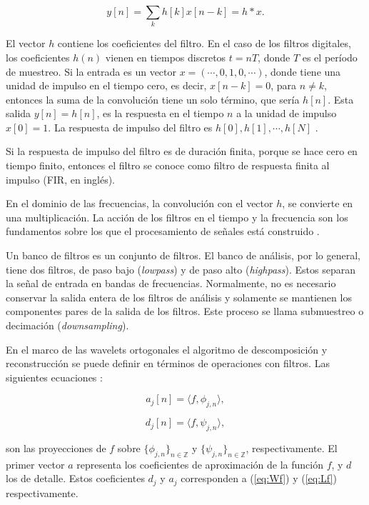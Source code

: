 \begin{equation}
	y[n] = \sum_{k} h[k]x[n-k] = h * x.
\end{equation}

El vector $h$ contiene los coeficientes del filtro. En el caso de los filtros digitales, los 
coeficientes $h(n)$ vienen en tiempos discretos $t=nT$, donde $T$ es el período de muestreo. 
Si la entrada es un vector $x=(\cdots,0,1,0,\cdots)$, donde tiene una unidad de impulso en el tiempo cero,
es decir, $x[n-k]=0$, para $n \neq k$, entonces la suma de la convolución tiene un solo término, que sería
$h[n]$. Esta salida $y[n]=h[n]$, es la respuesta en el tiempo $n$ a la unidad de impulso
$x[0]=1$. La respuesta de impulso del filtro es $h[0],h[1],\cdots,h[N]$ \cite{Gilbert95}.

Si la respuesta de impulso del filtro es de duración finita, porque se hace cero en tiempo finito, entonces
el filtro se conoce como filtro de respuesta finita al impulso (FIR, en inglés).

En el dominio de las frecuencias, la convolución con el vector $h$, se convierte en una multiplicación. La 
acción de los filtros en el tiempo y la frecuencia son los fundamentos sobre los que el procesamiento de señales
está construido \cite{Gilbert95}.

Un banco de filtros es un conjunto de filtros. El banco de análisis, por lo general, tiene dos filtros, 
de paso bajo (\textit{lowpass}) y de paso alto (\textit{highpass}). Estos separan la señal 
de entrada en bandas de frecuencias. Normalmente, no es necesario
conservar la salida entera de los filtros de análisis y solamente se mantienen los componentes pares de la salida
de los filtros. Este proceso se llama submuestreo o decimación (\textit{downsampling}). 

En el marco de las wavelets ortogonales el algoritmo de descomposición y reconstrucción se puede definir
en términos de operaciones con filtros. Las siguientes ecuaciones \cite{Mallat2008}:

\begin{equation}
	a_j[n] = \langle f,\phi_{j,n} \rangle,
\end{equation}

\begin{equation}
	d_j[n] = \langle f,\psi_{j,n} \rangle,
\end{equation}

\noindent son las proyecciones de $f$ sobre $\{\phi_{j,n}\}_{n\in \mathbb{Z}}$ y $\{\psi_{j,n}\}_{n\in \mathbb{Z}}$, 
respectivamente. El primer vector $a$ representa los coeficientes de aproximación de la función $f$,
y $d$ los de detalle. Estos coeficientes $d_j$ y $a_j$ corresponden a (\ref{eq:Wf}) y (\ref{eq:Lf}) 
respectivamente. 

